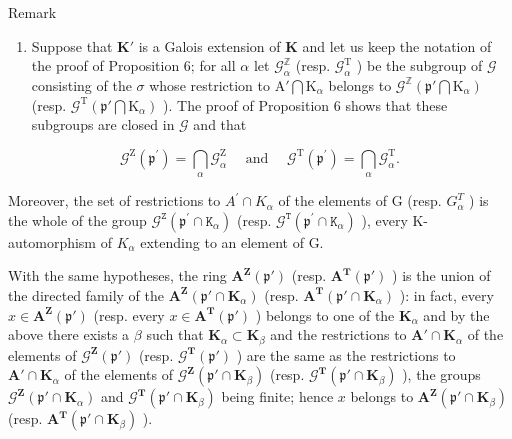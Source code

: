 Remark

\begin{enumerate}
\def\labelenumi{(\arabic{enumi})}
\setcounter{enumi}{1}
\tightlist
\item
  Suppose that \(\mathbf{K}'\) is a Galois extension of \(\mathbf{K}\) and let us keep the notation of the proof of Proposition 6; for all \(\alpha\) let \(\mathcal{G}_{\alpha}^{\mathbb{Z}}\) (resp. \(\mathcal{G}_{\alpha}^{\mathrm{T}}\) ) be the subgroup of \(\mathcal{G}\) consisting of the \(\sigma\) whose restriction to \(\mathrm{A}' \bigcap \mathrm{K}_{\alpha}\) belongs to \(\mathcal{G}^{\mathbb{Z}}(\mathfrak{p}' \bigcap \mathrm{K}_{\alpha})\) (resp. \(\mathcal{G}^{\mathrm{T}}(\mathfrak{p}' \bigcap \mathrm{K}_{\alpha})\) ). The proof of Proposition 6 shows that these subgroups are closed in \(\mathcal{G}\) and that
\end{enumerate}

\[
\mathcal {G} ^ {\mathrm{Z}} \left(\mathfrak {p} ^ {\prime}\right) = \bigcap_ {\alpha} \mathcal {G} _ {\alpha} ^ {\mathrm{Z}} \quad \text { and } \quad \mathcal {G} ^ {\mathrm{T}} \left(\mathfrak {p} ^ {\prime}\right) = \bigcap_ {\alpha} \mathcal {G} _ {\alpha} ^ {\mathrm{T}}.
\]

Moreover, the set of restrictions to \(A^{\prime} \cap K_{\alpha}\) of the elements of G (resp. \(G_{\alpha}^{T}\) ) is the whole of the group \(\mathcal{G}^{\mathtt{Z}}(\mathfrak{p}^{\prime} \cap \mathtt{K}_{\alpha})\) (resp. \(\mathcal{G}^{\mathtt{T}}(\mathfrak{p}^{\prime} \cap \mathtt{K}_{\alpha})\) ), every K-automorphism of \(K_{\alpha}\) extending to an element of G.

With the same hypotheses, the ring \(\mathbf{A}^{\mathbf{Z}}(\mathfrak{p}')\) (resp. \(\mathbf{A}^{\mathbf{T}}(\mathfrak{p}')\) ) is the union of the directed family of the \(\mathbf{A}^{\mathbf{Z}}(\mathfrak{p}' \cap \mathbf{K}_{\alpha})\) (resp. \(\mathbf{A}^{\mathbf{T}}(\mathfrak{p}' \cap \mathbf{K}_{\alpha})\) ): in fact, every \(x \in \mathbf{A}^{\mathbf{Z}}(\mathfrak{p}')\) (resp. every \(x \in \mathbf{A}^{\mathbf{T}}(\mathfrak{p}')\) ) belongs to one of the \(\mathbf{K}_{\alpha}\) and by the above there exists a \(\beta\) such that \(\mathbf{K}_{\alpha} \subset \mathbf{K}_{\beta}\) and the restrictions to \(\mathbf{A}' \cap \mathbf{K}_{\alpha}\) of the elements of \(\mathcal{G}^{\mathbf{Z}}(\mathfrak{p}')\) (resp. \(\mathcal{G}^{\mathbf{T}}(\mathfrak{p}')\) ) are the same as the restrictions to \(\mathbf{A}' \cap \mathbf{K}_{\alpha}\) of the elements of \(\mathcal{G}^{\mathbf{Z}}(\mathfrak{p}' \cap \mathbf{K}_{\beta})\) (resp. \(\mathcal{G}^{\mathbf{T}}(\mathfrak{p}' \cap \mathbf{K}_{\beta})\) ), the groups \(\mathcal{G}^{\mathbf{Z}}(\mathfrak{p}' \cap \mathbf{K}_{\alpha})\) and \(\mathcal{G}^{\mathbf{T}}(\mathfrak{p}' \cap \mathbf{K}_{\beta})\) being finite; hence \(x\) belongs to \(\mathbf{A}^{\mathbf{Z}}(\mathfrak{p}' \cap \mathbf{K}_{\beta})\) (resp. \(\mathbf{A}^{\mathbf{T}}(\mathfrak{p}' \cap \mathbf{K}_{\beta})\) ).

